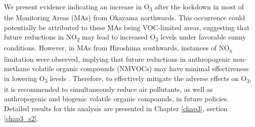 We present evidence indicating an increase in O\textsubscript{3} after the lockdown in most of the Monitoring Areas (MAs) from Okayama northwards. This occurrence could potentially be attributed to these MAs being VOC-limited areas, suggesting that future reductions in NO\textsubscript{2} may lead to increased O\textsubscript{3} levels under favorable sunny conditions. However, in MAs from Hiroshima southwards, instances of NO\textsubscript{x} limitation were observed, implying that future reductions in anthropogenic non-methane volatile organic compounds (NMVOCs) may have minimal effectiveness in lowering O\textsubscript{3} levels \citep{akimoto2022rethinking}. Therefore, to effectively mitigate the adverse effects on O\textsubscript{3}, it is recommended to simultaneously reduce air pollutants, as well as anthropogenic and biogenic volatile organic compounds, in future policies. Detailed results for this analysis are presented in Chapter \ref{chap3}, section \ref{chap3_s2}. \par

